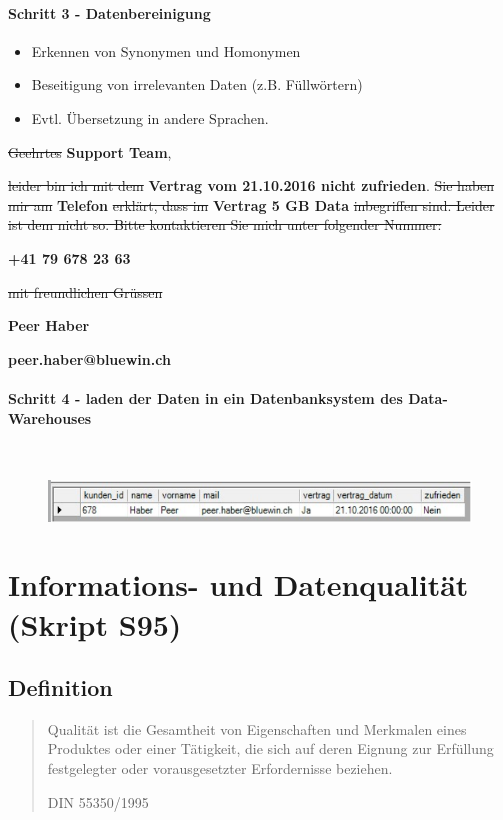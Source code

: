 \documentclass[a4paper, 11pt, nofootinbib]{article}
\begin{document}
\paragraph{Schritt 3 - Datenbereinigung}
\begin{itemize}
	\item Erkennen von Synonymen und Homonymen
	\item Beseitigung von irrelevanten Daten (z.B. Füllwörtern)
	\item Evtl. Übersetzung in andere Sprachen.
\end{itemize}

\noindent \sout{Geehrtes} \textbf{Support Team},

\noindent \sout{leider bin ich mit dem} \textbf{Vertrag vom 21.10.2016 nicht zufrieden}. \sout{Sie
haben mir am} \textbf{Telefon}\sout{ erklärt, dass im} \textbf{ Vertrag 5 GB Data} \sout{inbegriffen
sind. Leider ist dem nicht so. Bitte kontaktieren Sie mich unter folgender Nummer:}

\noindent \textbf{+41 79 678 23 63}

\noindent \sout{mit freundlichen Grüssen}

\noindent \textbf{Peer Haber}

\noindent \textbf{peer.haber@bluewin.ch}

\paragraph{Schritt 4 - laden der Daten in ein Datenbanksystem des Data-Warehouses}\mbox{} \\

\begin{figure}[htb]
	\centering
	\includegraphics[keepaspectratio=true,height=3.5\baselineskip]{haber_peer.PNG}
\end{figure}

\section{Informations- und Datenqualität (Skript S95)}
\subsection{Definition}
\blockquote[DIN 55350/1995]{Qualität ist die Gesamtheit von Eigenschaften und Merkmalen eines Produktes oder einer Tätigkeit, die sich auf deren Eignung zur Erfüllung festgelegter oder vorausgesetzter Erfordernisse beziehen.}
\vspace{10px}
\end{document}
